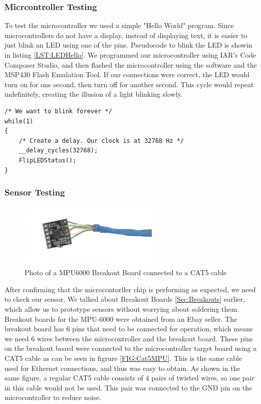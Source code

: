 \subsubsection{Micrcontroller Testing}
To test the microcontroller we used a simple "Hello World" program.
Since microcontrollers do not have a display, instead of displaying text,
it is easier to just blink an LED using one of the pins.
Pseudocode to blink the LED is showin in listing \ref{LST:LEDHello}.
We programmed our microcontroller using IAR's Code Composer Studio,
and then flashed the microcontroller using the software and the MSP430 Flash Emulation Tool.
If our connections were correct,
the LED would turn on for one second,
then turn off for another second.
This cycle would repeat indefinitely, creating the illusion of a light blinking slowly.
\begin{lstlisting}[caption=My caption,label=LST:LEDHello]
/* We want to blink forever */
while(1)
{
	/* Create a delay. Our clock is at 32768 Hz */
	__delay_cycles(32768);
	FlipLEDStatus();  
}
\end{lstlisting}


\subsubsection{Sensor Testing}
\label{Sec:SensorTesting}
\begin{figure}
\begin{center}
\includegraphics[width=0.6\textwidth]{images/CAT6MPU.jpg}
\caption{Photo of a MPU6000 Breakout Board connected to a CAT5 cable}
\label{Fig:CAt5MPU}
\end{center}
\end{figure}

After confirming that the microcontorller chip is performing as expected,
we need to check our sensor. We talked about Breakout Boards \ref{Sec:Breakouts} earlier,
which allow us to prototype sensors without worrying about soldering them.
Breakout boards for the MPU-6000 were obtained from an Ebay seller.
The breakout board has 6 pins that need to be connected for operation,
which means we need 6 wires between the microcontroller and the breakout board.
These pins on the breakout board were connected to the microcontroller target board using a CAT5 cable as can be seen in figrure \ref{FIG:Cat5MPU}.
This is the same cable used for Ethernet connections, and thus was easy to obtain.
As shown in the same figure,
a regular CAT5 cable consists of 4 pairs of twisted wires,
so one pair in this cable would not be used.
This pair was connected to the GND pin on the microcontroller to reduce noise.

